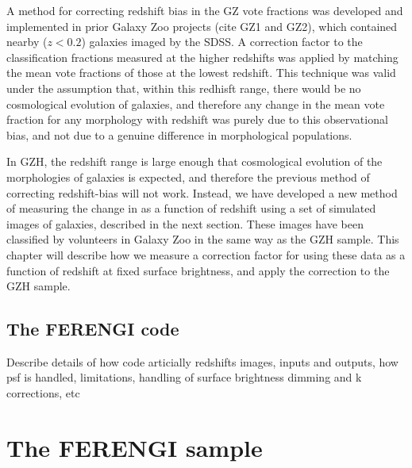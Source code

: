 A method for correcting redshift bias in the GZ vote fractions was developed and implemented in prior Galaxy Zoo projects (cite GZ1 and GZ2), which contained nearby ($z<0.2$) galaxies imaged by the SDSS. A correction factor to the classification fractions measured at the higher redshifts was applied by matching the mean vote fractions of those at the lowest redshift. This technique was valid under the assumption that, within this redhisft range, there would be no cosmological evolution of galaxies, and therefore any change in the mean vote fraction for any morphology with redshift was purely due to this observational bias, and not due to a genuine difference in morphological populations. 

In GZH, the redshift range is large enough that cosmological evolution of the morphologies of galaxies is expected, and therefore the previous method of correcting redshift-bias will not work. Instead, we have developed a new method of measuring the change in \ffeatures{} as a function of redshift using a set of simulated \ferengi{} images of galaxies, described in the next section. These images have been classified by volunteers in Galaxy Zoo in the same way as the GZH sample. This chapter will describe how we measure a correction factor for \ffeatures{} using these data as a function of redshift at fixed surface brightness, and apply the correction to the GZH sample. 

\subsection{The FERENGI code}
\label{sec:ferengicode}
Describe details of how code articially redshifts images, inputs and outputs, how psf is handled, limitations, handling of surface brightness dimming and k corrections, etc \citep{Barden2008}

\section{The FERENGI sample}
\label{sec:ferengi1sample}

